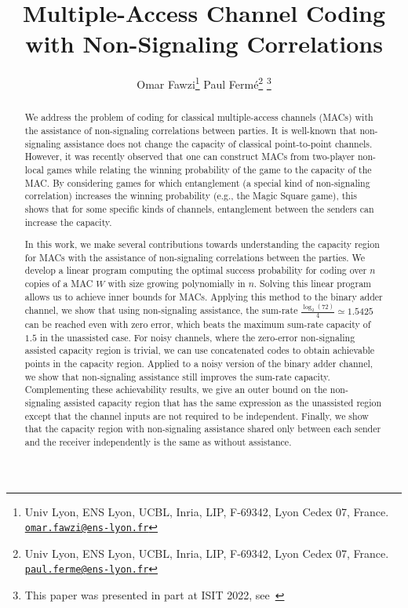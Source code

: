 \documentclass[11pt]{article}
\title{\bfseries Multiple-Access Channel Coding \\
with Non-Signaling Correlations}
\author{Omar Fawzi\footnote{Univ Lyon, ENS Lyon, UCBL, Inria,  LIP, F-69342, Lyon Cedex 07, France. \href{mailto:omar.fawzi@ens-lyon.fr}{\texttt{omar.fawzi@ens-lyon.fr}}} \qquad Paul Fermé\footnote{Univ Lyon, ENS Lyon, UCBL, Inria, LIP, F-69342, Lyon Cedex 07, France. \href{mailto:paul.ferme@ens-lyon.fr}{\texttt{paul.ferme@ens-lyon.fr}}} \footnote{This paper was presented in part at ISIT 2022, see~\cite{FF22}}}
\date{}
\theoremstyle{definition}
\theoremstyle{remark}
\begin{document}
\maketitle

\begin{abstract}
We address the problem of coding for classical multiple-access channels (MACs) with the assistance of non-signaling correlations between parties. It is well-known that non-signaling assistance does not change the capacity of classical point-to-point channels. However, it was recently observed that one can construct MACs from two-player non-local games while relating the winning probability of the game to the capacity of the MAC. By considering games for which entanglement (a special kind of non-signaling correlation) increases the winning probability (e.g., the Magic Square game), this shows that for some specific kinds of channels, entanglement between the senders can increase the capacity.

In this work, we make several contributions towards understanding the capacity region for MACs with the assistance of non-signaling correlations between the parties. We develop a linear program computing the optimal success probability for coding over $n$ copies of a MAC $W$ with size growing polynomially in $n$. Solving this linear program allows us to achieve inner bounds for MACs. Applying this method to the binary adder channel, we show that using non-signaling assistance, the sum-rate $\frac{\log_2(72)}{4} \simeq 1.5425$ can be reached even with zero error, which beats the maximum sum-rate capacity of $1.5$ in the unassisted case. For noisy channels, where the zero-error non-signaling assisted capacity region is trivial, we can use concatenated codes to obtain achievable points in the capacity region. Applied to a noisy version of the binary adder channel, we show that non-signaling assistance still improves the sum-rate capacity. Complementing these achievability results, we give an outer bound on the non-signaling assisted capacity region that has the same expression as the unassisted region except that the channel inputs are not required to be independent. Finally, we show that the capacity region with non-signaling assistance shared only between each sender and the receiver independently is the same as without assistance.
\end{abstract}
\end{document}
